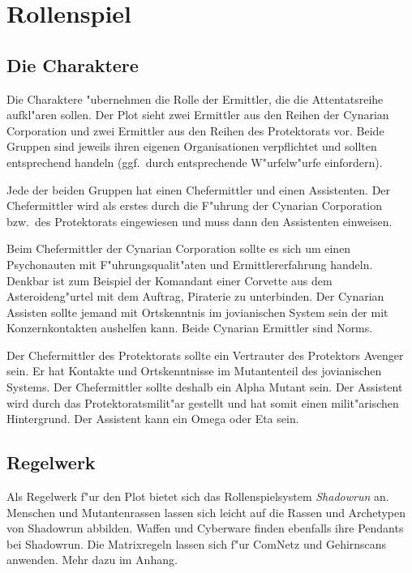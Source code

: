 \section{Rollenspiel}

\subsection{Die Charaktere}

Die Charaktere "ubernehmen die Rolle der Ermittler, die die Attentatsreihe aufkl"aren sollen. Der Plot sieht zwei Ermittler aus den Reihen der Cynarian Corporation und zwei Ermittler aus den Reihen des Protektorats vor. Beide Gruppen sind jeweils ihren eigenen Organisationen verpflichtet und sollten entsprechend handeln (ggf.~durch entsprechende W"urfelw"urfe einfordern).

Jede der beiden Gruppen hat einen Chefermittler und einen Assistenten. Der Chefermittler wird als erstes durch die F"uhrung der Cynarian Corporation bzw.~des Protektorats eingewiesen und muss dann den Assistenten einweisen.

Beim Chefermittler der Cynarian Corporation sollte es sich um einen Psychonauten mit F"uhrungsqualit"aten und Ermittlererfahrung handeln. Denkbar ist zum Beispiel der Komandant einer Corvette aus dem Asteroideng"urtel mit dem Auftrag, Piraterie zu unterbinden. Der Cynarian Assisten sollte jemand mit Ortskenntnis im jovianischen System sein der mit Konzernkontakten aushelfen kann. Beide Cynarian Ermittler sind Norms.

Der Chefermittler des Protektorats sollte ein Vertrauter des Protektors Avenger sein. Er hat Kontakte und Ortskenntnisse im Mutantenteil des jovianischen Systems. Der Chefermittler sollte deshalb ein Alpha Mutant sein. Der Assistent wird durch das Protektoratsmilit"ar gestellt und hat somit einen milit"arischen Hintergrund. Der Assistent kann ein Omega oder Eta sein.

\subsection{Regelwerk}

Als Regelwerk f"ur den Plot bietet sich das Rollenspielsystem \emph{Shadowrun} an. Menschen und Mutantenrassen lassen sich leicht auf die Rassen und Archetypen von Shadowrun abbilden. Waffen und Cyberware finden ebenfalls ihre Pendants bei Shadowrun. Die Matrixregeln lassen sich f"ur ComNetz und Gehirnscans anwenden. Mehr dazu im Anhang.
